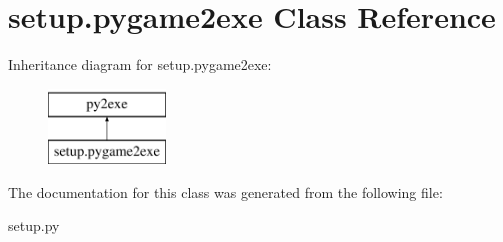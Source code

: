 \hypertarget{classsetup_1_1pygame2exe}{\section{setup.\-pygame2exe Class Reference}
\label{classsetup_1_1pygame2exe}
}
Inheritance diagram for setup.\-pygame2exe\-:\begin{figure}[H]
\begin{center}
\leavevmode
\includegraphics[height=2.000000cm]{classsetup_1_1pygame2exe}
\end{center}
\end{figure}


The documentation for this class was generated from the following file\-:\begin{DoxyCompactItemize}
\item 
setup.\-py\end{DoxyCompactItemize}

